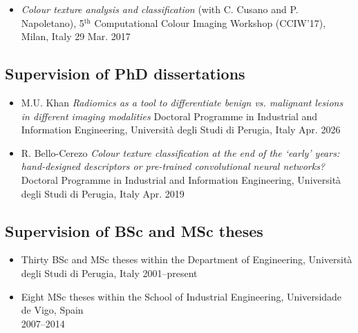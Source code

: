 \documentclass[11pt]{article}
\begin{document}
\begin{itemize}
	\item \emph{Colour texture analysis and classification} (with C. Cusano and P. Napoletano), 5$^\text{th}$ Computational Colour Imaging Workshop (CCIW’17), Milan, Italy \hfill 29 Mar. 2017
\end{itemize}

\subsection*{Supervision of PhD dissertations}

\begin{itemize}
	\item M.U. Khan \emph{Radiomics as a tool to differentiate benign vs. malignant lesions in different imaging modalities} Doctoral Programme in Industrial and Information Engineering, Università degli Studi di Perugia, Italy \hfill Apr. 2026
	
	\item R. Bello-Cerezo \emph{Colour texture classification at the end of the `early' years: hand-designed descriptors or pre-trained convolutional neural networks?} Doctoral Programme in Industrial and Information Engineering, Università degli Studi di Perugia, Italy \hfill Apr. 2019
\end{itemize}

\subsection*{Supervision of BSc and MSc theses}

\begin{itemize}
	\item Thirty BSc and MSc theses within the Department of Engineering, Università degli Studi di Perugia, Italy \hfill 2001--present
	\item Eight MSc theses within the School of Industrial Engineering, Universidade de Vigo, Spain \\ \mbox{} \hfill 2007--2014
\end{itemize}
\end{document}
